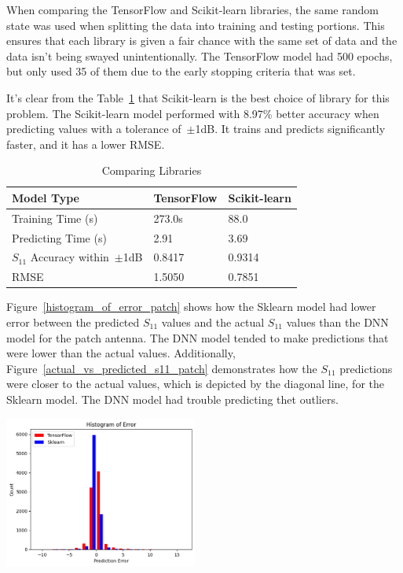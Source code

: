 \documentclass[lettersize,journal]{IEEEtran}
\newenvironment{Figure}
    {\par\medskip\noindent\minipage{\linewidth}}
    {\endminipage\par\medskip}
\begin{document}
When comparing the TensorFlow and Scikit-learn libraries, the same random state was used when splitting the data into training and testing portions. This ensures that each library is given a fair chance with the same set of data and the data isn't being swayed unintentionally. The TensorFlow model had 500 epochs, but only used 35 of them due to the early stopping criteria that was set. 

It's clear from the Table~\ref{comparing_libraries} that Scikit-learn is the best choice of library for this problem. The Scikit-learn model performed with 8.97\% better accuracy when predicting values with a tolerance of~$\pm$1dB. It trains and predicts significantly faster, and it has a lower RMSE.

\begin{table}[h]
\caption{Comparing Libraries}
\begin{center}
\begin{tabular}{ |l|l|l| }
    \hline
    Model Type & TensorFlow & Scikit-learn \\ 
    \hline
    Training Time (s) & 273.0s & 88.0 \\  
    \hline
    Predicting Time (s) & 2.91 & 3.69 \\
    \hline
    $S_{11}$ Accuracy within~$\pm$1dB & 0.8417 & 0.9314 \\
    \hline
    RMSE & 1.5050 & 0.7851 \\
    \hline
\end{tabular}
\end{center}
\label{comparing_libraries}
\end{table}

Figure~\ref{histogram_of_error_patch} shows how the Sklearn model had lower error between the predicted $S_{11}$ values and the actual $S_{11}$ values than the DNN model for the patch antenna. The DNN model tended to make predictions that were lower than the actual values. Additionally, Figure~\ref{actual_vs_predicted_s11_patch} demonstrates how the $S_{11}$ predictions were closer to the actual values, which is depicted by the diagonal line, for the Sklearn model. The DNN model had trouble predicting thet outliers. 

\begin{Figure}
    \centering
    \includegraphics[width=2.5in]{histogram_patch}
    \label{histogram_of_error_patch}
\end{Figure}
\end{document}
